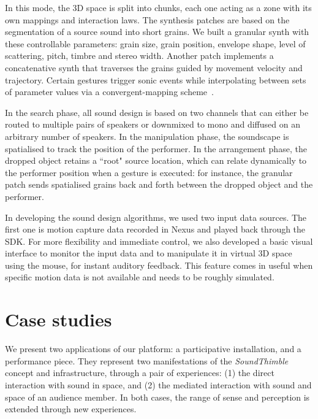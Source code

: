 \documentclass{nime-alternate}
\begin{document}
In this mode, the 3D space is split into chunks, each one acting as a zone with its own mappings and interaction laws. The synthesis patches are based on the segmentation of a source sound into short grains. We built a granular synth with these controllable parameters: grain size, grain position, envelope shape, level of scattering, pitch, timbre and stereo width. Another patch implements a concatenative synth that traverses the grains guided by movement velocity and trajectory. Certain gestures trigger sonic events while interpolating between sets of parameter values via a convergent-mapping scheme~\cite{102}. %


In the search phase, all sound design is based on two channels that can either be routed to multiple pairs of speakers or downmixed to mono and diffused on an arbitrary number of speakers. In the manipulation phase, the soundscape is spatialised to track the position of the performer. In the arrangement phase, the dropped object retains a ``root" source location, which can relate dynamically to the performer position when a gesture is executed: for instance, the granular patch sends spatialised grains back and forth between the dropped object and the performer.


In developing the sound design algorithms, we used two input data sources. The first one is motion capture data recorded in Nexus and played back through the SDK. For more flexibility and immediate control, we also developed a basic visual interface to monitor the input data and to manipulate it in virtual 3D space using the mouse, for instant auditory feedback. This feature comes in useful when specific motion data is not available and needs to be roughly simulated.

\section{Case studies}
\label{sec:case}

We present two applications of our platform: a participative installation, and a performance piece. They represent two manifestations of the \textit{SoundThimble} concept and infrastructure, through a pair of experiences: (1) the direct interaction with sound in space, and (2) the mediated interaction with sound and space of an audience member. In both cases, the range of sense and perception is extended through new experiences.
\end{document}
